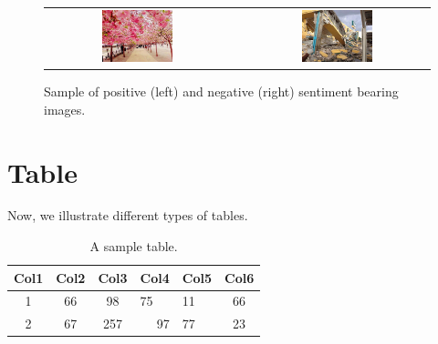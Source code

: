\documentclass[11pt]{article}
\begin{document}

\begin{figure}[!htb]
\centering
\begin{tabular}{cp{0.5cm}c}
\includegraphics[width=0.4\textwidth]{Pos4.jpg}
&
&\includegraphics[width=0.4\textwidth]{Neg3.jpg}
\end{tabular}
\caption{Sample of positive (left) and negative (right) sentiment bearing images.}
\label{Fig:sampleImage}
\end{figure}

\section{Table}
\label{ref:table}
Now, we illustrate different types of tables.

\begin{table}[!htb]
\centering
\caption{A sample table.}
\begin{tabular}{|c|c|c|m{4cm}|l|c|} %

\hline
Col1 & \textbf{Col2} & Col3 & \multicolumn{1}{c|}{Col4} & Col5 & Col6 \\
\hline
1 & 66 & 98 & 75 & 11 & 66 \\
\hline
2 & 67 & 257 & \multicolumn{1}{r|}{97} & 77 & 23 \\
\hline
\end{tabular}
\end{table}
\end{document}
